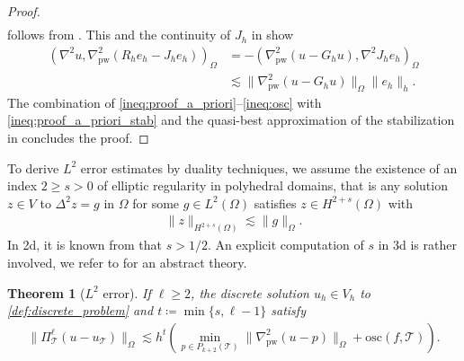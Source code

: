 \documentclass[a4paper]{amsart}
\numberwithin{equation}{section}
\def\T{\mathcal{T}}
\def\pw{\mathrm{pw}}
\newtheorem{theorem}{Theorem}[section]
\theoremstyle{definition}
\theoremstyle{remark}
\numberwithin{theorem}{section}
\numberwithin{equation}{section}
\numberwithin{table}{section}
\numberwithin{figure}{section}
\begin{document}
\begin{proof}
\begin{align}
    \end{align}
    follows from . This and the continuity of $J_h$ in  show
    \begin{align}\label{ineq:proof_a_priori_stab}
        (\nabla^2 u,\nabla^2_\mathrm{pw} (R_h e_h - J_h e_h))_\Omega &= 
        - (\nabla^2_\pw (u - G_h u),\nabla^2 J_h e_h)_\Omega\nonumber\\ &\lesssim \|\nabla_\pw^2 (u - G_h u)\|_\Omega \|e_h\|_{h}.
    \end{align}
    The combination of \eqref{ineq:proof_a_priori}--\eqref{ineq:osc} with \eqref{ineq:proof_a_priori_stab} and the quasi-best approximation of the stabilization in  concludes the proof.
\end{proof}

To derive $L^2$ error estimates by duality techniques, we assume the existence of an index $2 \geq s > 0$ of elliptic regularity in polyhedral domains, that is any solution $z \in V$ to
$\Delta^2 z = g$ in $\Omega$
for some $g \in L^2(\Omega)$ satisfies $z \in H^{2+s}(\Omega)$ with
\begin{align}\label{ineq:elliptic-reg}
	\|z\|_{H^{2+s}(\Omega)} \lesssim \|g\|_\Omega.
\end{align}
In 2d, it is known from \cite{BlumRannacher1980,MelzerRannacher1980} that $s>1/2$. An explicit computation of $s$ in 3d is rather involved, we refer to \cite{Dauge1988} for an abstract theory.
\begin{theorem}[$L^2$ error]\label{thm:L2}
	If $\ell \geq 2$, the discrete solution $u_h \in V_h$ to \eqref{def:discrete_problem} and $t \coloneqq \min\{s,\ell-1\}$ satisfy
	\begin{align*}
		\|\Pi_\T^\ell(u - u_\T)\|_\Omega \lesssim h^{t} (\min_{p \in P_{k+2}(\mathcal{T})}\|\nabla^2_\pw(u - p)\|_{\Omega} + \mathrm{osc}(f,\T)).
	\end{align*}
\end{theorem}
\end{document}
